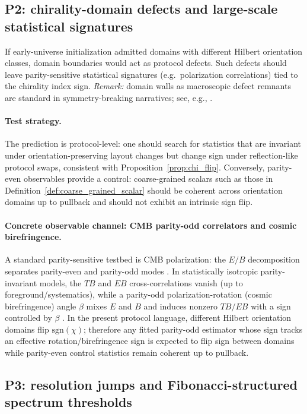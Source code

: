 \subsection{P2: chirality-domain defects and large-scale statistical signatures}
\label{subsec:p2_domain_walls}

If early-universe initialization admitted domains with different Hilbert orientation classes, domain boundaries would act as protocol defects.
Such defects should leave parity-sensitive statistical signatures (e.g.\ polarization correlations) tied to the chirality index sign.
\emph{Remark:} domain walls as macroscopic defect remnants are standard in symmetry-breaking narratives; see, e.g., \cite{VilenkinShellard1994,ZeldovichKobzarevOkun1974}.
\paragraph{Test strategy.}
The prediction is protocol-level: one should search for statistics that are invariant under orientation-preserving layout changes but change sign under reflection-like protocol swaps, consistent with Proposition~\ref{prop:chi_flip}.
Conversely, parity-even observables provide a control: coarse-grained scalars such as those in Definition~\ref{def:coarse_grained_scalar} should be coherent across orientation domains up to pullback and should not exhibit an intrinsic sign flip.

\paragraph{Concrete observable channel: CMB parity-odd correlators and cosmic birefringence.}
A standard parity-sensitive testbed is CMB polarization: the $E/B$ decomposition separates parity-even and parity-odd modes \cite{ZaldarriagaSeljak1997,KamionkowskiKosowskyStebbins1997}.
In statistically isotropic parity-invariant models, the $TB$ and $EB$ cross-correlations vanish (up to foreground/systematics), while a parity-odd polarization-rotation (cosmic birefringence) angle $\beta$ mixes $E$ and $B$ and induces nonzero $TB/EB$ with a sign controlled by $\beta$ \cite{LueWangKamionkowski1999,MinamiKomatsu2020}.
In the present protocol language, different Hilbert orientation domains flip $\mathrm{sgn}(\chi)$; therefore any fitted parity-odd estimator whose sign tracks an effective rotation/birefringence sign is expected to flip sign between domains while parity-even control statistics remain coherent up to pullback.

\subsection{P3: resolution jumps and Fibonacci-structured spectrum thresholds}
\label{subsec:p3_resolution_jumps}

